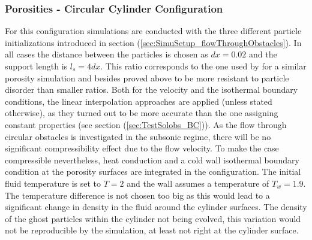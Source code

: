 \documentclass{report}
\begin{document}
\subsubsection{Porosities - Circular Cylinder Configuration}
For this configuration simulations are conducted with the three different particle initializations introduced in section (\ref{sec:SimuSetup_flowThroughObstacles}). In all cases the distance between the particles is chosen as $dx=0.02$ and the support length is $l_s=4dx$. This ratio corresponds to the one used by \cite{Zhu1999} for a similar porosity simulation and besides proved above to be more resistant to particle disorder than smaller ratios. Both for the velocity and the isothermal boundary conditions, the linear interpolation approaches are applied (unless stated otherwise), as they turned out to be more accurate than the one assigning constant properties (see section (\ref{sec:TestSolobs_BC})). As the flow through circular obstacles is investigated in the subsonic regime, there will be no significant compressibility effect due to the flow velocity. To make the case compressible nevertheless, heat conduction and a cold wall isothermal  boundary condition at the porosity surfaces are integrated in the configuration. The initial fluid temperature is set to $T=2$ and the wall assumes a temperature of $T_w=1.9$. The temperature difference is not chosen too big as this would lead to a significant change in density in the fluid around the cylinder surfaces. The density of the ghost particles within the cylinder not being evolved, this variation would not be reproducible by the simulation, at least not right at the cylinder surface.
\end{document}
